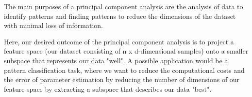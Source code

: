 The main purposes of a principal component analysis are the analysis of data to identify patterns and finding patterns to 
reduce the dimensions of the dataset with minimal loss of information.

Here, our desired outcome of the principal component analysis is to project a feature space (our dataset consisting of 
n x d-dimensional samples) onto a smaller subspace that represents our data "well". A possible application would be a pattern 
classification task, where we want to reduce the computational costs and the error of parameter estimation by reducing the 
number of dimensions of our feature space by extracting a subspace that describes our data "best".
